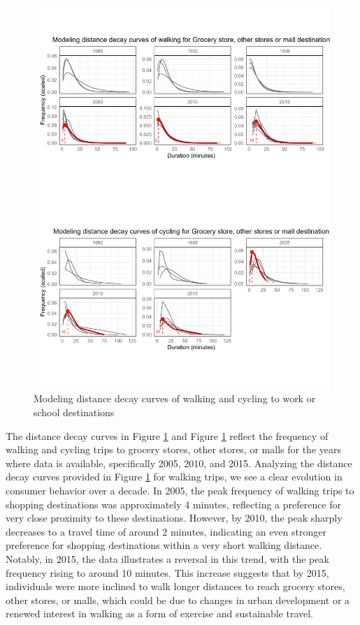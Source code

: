 \documentclass[
11pt, %
oneside, %
english, %
singlespacing, %
]{macthesis} %
\begin{document}
\begin{figure}

{\centering \includegraphics[width=1\linewidth]{figure/ch03_fig_06} 

}

\caption{Modeling distance decay curves of walking and cycling to work or school destinations}\label{fig:ch03-plot-fig-06}
\end{figure}

The distance decay curves in Figure \ref{fig:ch03-plot-fig-06} and Figure \ref{fig:ch03-plot-fig-06} reflect the frequency of walking and cycling trips to grocery stores, other stores, or malls for the years where data is available, specifically 2005, 2010, and 2015. Analyzing the distance decay curves provided in Figure \ref{fig:ch03-plot-fig-06} for walking trips, we see a clear evolution in consumer behavior over a decade. In 2005, the peak frequency of walking trips to shopping destinations was approximately 4 minutes, reflecting a preference for very close proximity to these destinations. However, by 2010, the peak sharply decreases to a travel time of around 2 minutes, indicating an even stronger preference for shopping destinations within a very short walking distance. Notably, in 2015, the data illustrates a reversal in this trend, with the peak frequency rising to around 10 minutes. This increase suggests that by 2015, individuals were more inclined to walk longer distances to reach grocery stores, other stores, or malls, which could be due to changes in urban development or a renewed interest in walking as a form of exercise and sustainable travel.
\end{document}
